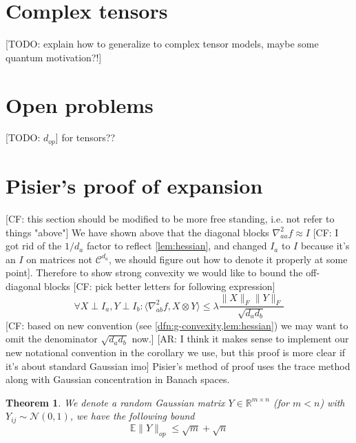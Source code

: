 \documentclass{article}
\newtheorem{theorem}{Theorem}
\newcommand{\R}{{\mathbb{R}}}
\newcommand{\E}{\mathbb{E}}
\newcommand\samp{x}
\newcommand\CC{\mathcal{C}}
\newcommand{\CF}[1]{{\color{purple}[CF: #1]}}
\newcommand{\AR}[1]{{\color{orange}[AR: #1]}}
\newcommand{\TODO}[1]{{\color{blue}[TODO: #1]}}
\begin{document}
\section{Complex tensors}
\TODO{explain how to generalize to complex tensor models, maybe some quantum motivation?!}

\section{Open problems}
\TODO{$d_{op}$} for tensors??








\appendix




\section{Pisier's proof of expansion}\label{sec:pisier}
\CF{this section should be modified to be more free standing, i.e. not refer to things "above"}
We have shown above that the diagonal blocks $\nabla^{2}_{aa} f \approx I$ \CF{ I got rid of the $1/{d_a}$ factor to reflect \cref{lem:hessian}, and changed $I_{a}$ to $I$ because it's an $I$ on matrices not $\CC^{d_a}$, we should figure out how to denote it properly at some point}. Therefore to show strong convexity we would like to bound the off-diagonal blocks \CF{pick better letters for following expression}
\[ \forall X \perp I_{a},Y \perp I_{b}:  \langle \nabla^{2}_{ab} f, X \otimes Y \rangle \leq \lambda \frac{\|X\|_{F} \|Y\|_{F}}{\sqrt{d_{a} d_{b}}}   \]
\CF{based on new convention (see \cref{dfn:g-convexity,lem:hessian}) we may want to omit the denominator $\sqrt{d_{a} d_{b}}$ now.} \AR{I think it makes sense to implement our new notational convention in the corollary we use, but this proof is more clear if it's about standard Gaussian imo} Pisier's method of proof uses the trace method along with Gaussian concentration in Banach spaces.

\begin{theorem}
We denote a random Gaussian matrix $Y \in \R^{m \times n}$ (for $m < n$) with $Y_{ij} \sim \mathcal{N}(0,1)$, we have the following bound
\[ \E \|Y\|_{op} \leq \sqrt{m} + \sqrt{n} \]
\end{theorem}
\end{document}
